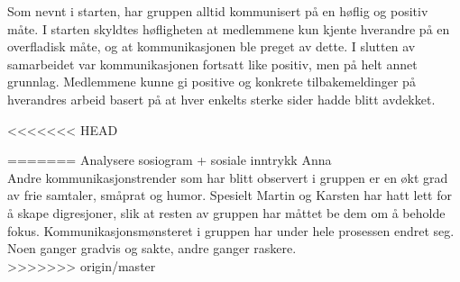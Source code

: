 Som nevnt i starten, har gruppen alltid kommunisert på en høflig og positiv måte. I starten skyldtes høfligheten at medlemmene kun kjente hverandre på en overfladisk måte, og at kommunikasjonen ble preget av dette. I slutten av samarbeidet var kommunikasjonen fortsatt like positiv, men på helt annet grunnlag. Medlemmene kunne gi positive og konkrete tilbakemeldinger på hverandres arbeid basert på at hver enkelts sterke sider hadde blitt avdekket. 






















<<<<<<< HEAD


=======
Analysere sosiogram + sosiale inntrykk Anna
\\
Andre kommunikasjonstrender som har blitt observert i gruppen er en økt grad av frie samtaler, småprat og humor. Spesielt Martin og Karsten har hatt lett for å skape digresjoner, slik at resten av gruppen har måttet be dem om å beholde fokus. 
Kommunikasjonsmønsteret i gruppen har under hele prosessen endret seg.
Noen ganger gradvis og sakte, andre ganger raskere. 
\\
>>>>>>> origin/master
